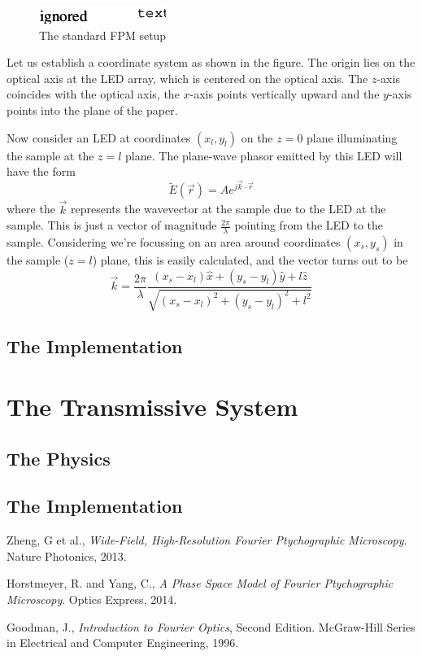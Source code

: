 \documentclass[11pt,a4paper,journal]{IEEEtran}
\begin{document}
\begin{figure}
  \caption{The standard FPM setup}
  \centering
    \includegraphics[scale=1]{fpm_setup}
\end{figure}

Let us establish a coordinate system as shown in the figure. The origin lies on the optical axis at the LED array, which is centered on the optical axis. The $z$-axis coincides with the optical axis, the $x$-axis points vertically upward and the $y$-axis points into the plane of the paper.

Now consider an LED at coordinates $(x_l, y_l)$ on the $z=0$ plane illuminating the sample at the $z=l$ plane. The plane-wave phasor emitted by this LED will have the form
\begin{equation}
\tilde{E}(\vec{r}) = A e^{j \vec{k} \cdot \vec{r}}
\end{equation}
where the $\vec{k}$ represents the wavevector at the sample due to the LED at the sample. This is just a vector of magnitude $\frac{2\pi}{\lambda}$ pointing from the LED to the sample. Considering we're focussing on an area around coordinates $(x_s, y_s)$ in the sample ($z=l$) plane, this is easily calculated, and the vector turns out to be
\begin{equation}
\vec{k} = \frac{2\pi}{\lambda} \frac{(x_s-x_l)\hat{x}+(y_s-y_l)\hat{y}+l\hat{z}}{\sqrt{(x_s-x_l)^2+(y_s-y_l)^2+l^2}}
\end{equation}

\subsection{The Implementation}


\section{The Transmissive System}
\subsection{The Physics}
\subsection{The Implementation}

\begin{thebibliography}{10}

  Zheng, G et al.,
  \emph{Wide-Field, High-Resolution Fourier Ptychographic Microscopy}.
  Nature Photonics,
  2013.
  
  Horstmeyer, R. and Yang, C.,
  \emph{A Phase Space Model of Fourier Ptychographic Microscopy}.
  Optics Express,
  2014.
  
  Goodman, J.,
  \emph{Introduction to Fourier Optics}, Second Edition.
  McGraw-Hill Series in Electrical and Computer Engineering,
  1996.
  
\end{thebibliography}
\end{document}
